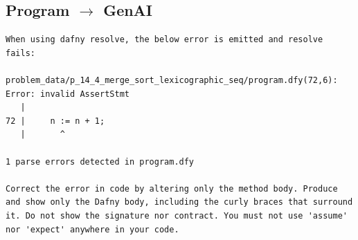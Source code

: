 \documentclass{article}
\begin{document}
\subsection*{Program $\rightarrow$ GenAI}
\begin{lstlisting}
When using dafny resolve, the below error is emitted and resolve fails:

problem_data/p_14_4_merge_sort_lexicographic_seq/program.dfy(72,6): Error: invalid AssertStmt
   |
72 |     n := n + 1;
   |       ^

1 parse errors detected in program.dfy

Correct the error in code by altering only the method body. Produce and show only the Dafny body, including the curly braces that surround it. Do not show the signature nor contract. You must not use 'assume' nor 'expect' anywhere in your code.
\end{lstlisting}
\end{document}
